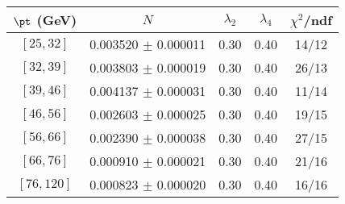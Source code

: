 \begin{tabular}{c||c|c|c|c}
$\pt$ (GeV) & $N$ & $\lambda_{2}$ & $\lambda_4$  & $\chi^2$/ndf  \\
\hline
$[25, 32]$ & 0.003520 $\pm$ 0.000011 & 0.30 & 0.40 & 14/12\\
$[32, 39]$ & 0.003803 $\pm$ 0.000019 & 0.30 & 0.40 & 26/13\\
$[39, 46]$ & 0.004137 $\pm$ 0.000031 & 0.30 & 0.40 & 11/14\\
$[46, 56]$ & 0.002603 $\pm$ 0.000025 & 0.30 & 0.40 & 19/15\\
$[56, 66]$ & 0.002390 $\pm$ 0.000038 & 0.30 & 0.40 & 27/15\\
$[66, 76]$ & 0.000910 $\pm$ 0.000021 & 0.30 & 0.40 & 21/16\\
$[76, 120]$ & 0.000823 $\pm$ 0.000020 & 0.30 & 0.40 & 16/16\\
\end{tabular}
